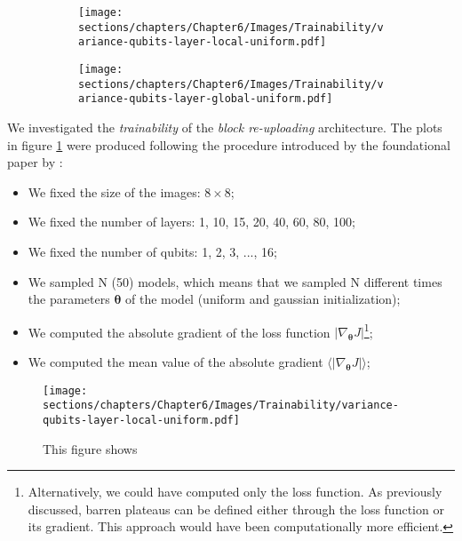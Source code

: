 \begin{figure}[h]
    \centering
    \begin{subfigure}[b]{\textwidth}
        \texttt{[image: sections/chapters/Chapter6/Images/Trainability/variance-qubits-layer-local-uniform.pdf]}
    \end{subfigure}
    \begin{subfigure}[b]{\textwidth}
        \texttt{[image: sections/chapters/Chapter6/Images/Trainability/variance-qubits-layer-global-uniform.pdf]}
    \end{subfigure}
    \label{fig:local-uniform}
\end{figure}




We investigated the \textit{trainability} of the \textit{block re-uploading} architecture. 
The plots in figure \ref{fig:local-uniform} were produced following the procedure introduced by 
the foundational paper by \cite{McClean_2018}:

\begin{itemize}
    \item We fixed the size of the images: $8\times8$;
    \item We fixed the number of layers: 1, 10, 15, 20, 40, 60, 80, 100;
    \item We fixed the number of qubits: 1, 2, 3, ..., 16;
    \item We sampled N (50) models, which means that we sampled N different times the parameters 
    $\bm{\theta}$ of the model (uniform and gaussian initialization);
    \item We computed the absolute gradient of the loss function $|\nabla_{\bm{\theta}}J|$\footnote[1]{
        Alternatively, we could have computed only the loss function. As previously discussed, 
        barren plateaus can be defined either through the loss function or its gradient. 
        This approach would have been computationally more efficient.
    };
    \item We computed the mean value of the absolute gradient $\langle |\nabla_{\bm{\theta}}J| \rangle$;
\end{itemize}



\begin{figure}[h]
    \centering
    \texttt{[image: sections/chapters/Chapter6/Images/Trainability/variance-qubits-layer-local-uniform.pdf]}
    \caption{This figure shows}
    \label{fig:local-gauss}
\end{figure}